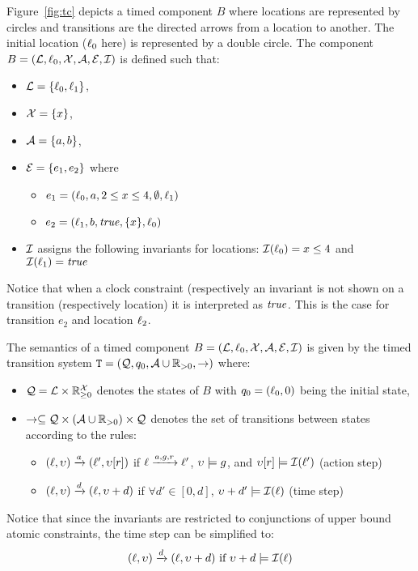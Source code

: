 \begin{example}
  Figure~\ref{fig:tc} depicts a timed component $B$ where locations
  are represented by circles and transitions are the directed arrows
  from a location to another. The initial location ($\ell_0$ here) is
  represented by a double circle. The component 
  $B=(\mathcal{L},\ell_0,\mathcal{X},\mathcal{A},\mathcal{E},\mathcal{I})$ is defined such that:
  \begin{itemize}
    \item $\mathcal{L}=\{\ell_0,\ell_1\}$,
    \item $\mathcal{X}=\{x\}$,
    \item $\mathcal{A}=\{a,b\}$,
    \item $\mathcal{E}=\{e_1,e_2\}$ where
      \begin{itemize}
        \item $e_1=(\ell_0,a,2\le x\le4,\emptyset,\ell_1)$
        \item $e_2=(\ell_1,b,\textnormal{\textit{true}},\{x\},\ell_0)$
      \end{itemize}
    \item $\mathcal{I}$ assigns the following invariants for locations: 
      $\mathcal{I}(\ell_0)=x\le4$ and $\mathcal{I}(\ell_1)=\textnormal{\textit{true}}$
  \end{itemize}
  Notice that when a clock constraint (respectively an invariant is not
  shown on a transition (respectively location) it is interpreted as $\textnormal{\textit{true}}$.
  This is the case for transition $e_2$ and location $\ell_2$.
\end{example}


\begin{definition}\label{def:std_sem}
The semantics of a timed component $B=(\mathcal{L},\ell_0,\mathcal{X},\mathcal{A},\mathcal{E},\mathcal{I})$ is given by the timed transition
  system $\texttt{T}=(\mathcal{Q},q_0,\mathcal{A}\cup\mathbb{R}_{> 0},\to)$ where:
  \begin{itemize}
    \item $\mathcal{Q}=\mathcal{L}\times\mathbb{R}_{\ge 0}^{\mathcal{X}}$ denotes the states
      of $B$ with $q_0=(\ell_0,0)$ being the initial state, 
    \item $\to\subseteq\mathcal{Q}\times(\mathcal{A}\cup\mathbb{R}_{> 0})\times\mathcal{Q}$
    denotes the set of transitions between states according to the rules:
  \begin{itemize}
    \item $(\ell,\upsilon)\xrightarrow{a}(\ell',\upsilon[r])$ if $\ell\xrightarrow{a,g,r}
      \ell'$, $\upsilon\models g$, and $\upsilon[r]\models\mathcal{I}(\ell')$
      (action step) 
    \item $(\ell,\upsilon)\xrightarrow{d}(\ell,\upsilon+d)$ if $\forall d'\in[0,d]$,
      $\upsilon+d'\models \mathcal{I}(\ell)$ (time step) 
  \end{itemize}
  \end{itemize}
\end{definition}
Notice that since the invariants are restricted to conjunctions of upper bound
atomic constraints, the time step can be simplified to:
\begin{displaymath}
  (\ell,\upsilon)\xrightarrow{d}(\ell,\upsilon+d)\text{ if }\upsilon+d\models \mathcal{I}(\ell) 
\end{displaymath}


